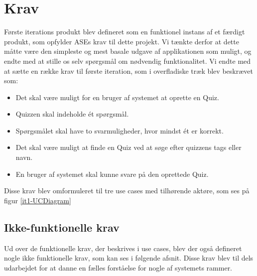 \chapter{Krav}
Første iterations produkt blev defineret som en funktionel instans af et færdigt produkt, som opfylder ASEs krav til dette projekt. Vi tænkte derfor at dette måtte være den simpleste og mest basale udgave af applikationen som muligt, og endte med at stille os selv spørgsmål om nødvendig funktionalitet.
Vi endte med at sætte en række krav til første iteration, som i overfladiske træk blev beskrævet som:
\begin{itemize}
	\item Det skal være muligt for en bruger af systemet at oprette en Quiz.
	\item Quizzen skal indeholde ét spørgsmål.
	\item Spørgsmålet skal have to svarmuligheder, hvor mindst ét er korrekt.
	\item Det skal være muligt at finde en Quiz ved at søge efter quizzens tags eller navn.
	\item En bruger af systemet skal kunne svare på den oprettede Quiz.
\end{itemize}

Disse krav blev omformuleret til tre use cases med tilhørende aktøre, som ses på figur \ref{it1-UCDiagram}


\section*{Ikke-funktionelle krav}
Ud over de funktionelle krav, der beskrives i use cases, blev der også defineret nogle ikke funktionelle krav, som kan ses i følgende afsnit. Disse krav blev til dels udarbejdet for at danne en fælles forståelse for nogle af systemets rammer.

